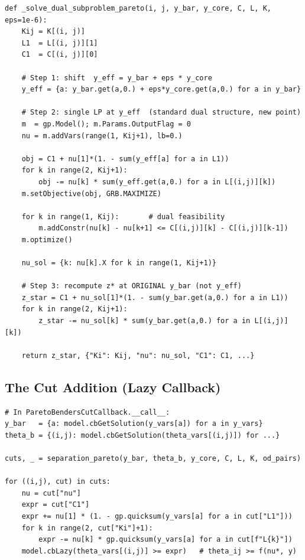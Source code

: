 \documentclass[12pt,a4paper]{article}
\begin{document}
\begin{lstlisting}[caption={Single-LP Pareto dual subproblem ($\varepsilon$-perturbation)}]
def _solve_dual_subproblem_pareto(i, j, y_bar, y_core, C, L, K, eps=1e-6):
    Kij = K[(i, j)]
    L1  = L[(i, j)][1]
    C1  = C[(i, j)][0]

    # Step 1: shift  y_eff = y_bar + eps * y_core
    y_eff = {a: y_bar.get(a,0.) + eps*y_core.get(a,0.) for a in y_bar}

    # Step 2: single LP at y_eff  (standard dual structure, new point)
    m  = gp.Model(); m.Params.OutputFlag = 0
    nu = m.addVars(range(1, Kij+1), lb=0.)

    obj = C1 + nu[1]*(1. - sum(y_eff[a] for a in L1))
    for k in range(2, Kij+1):
        obj -= nu[k] * sum(y_eff.get(a,0.) for a in L[(i,j)][k])
    m.setObjective(obj, GRB.MAXIMIZE)

    for k in range(1, Kij):       # dual feasibility
        m.addConstr(nu[k] - nu[k+1] <= C[(i,j)][k] - C[(i,j)][k-1])
    m.optimize()

    nu_sol = {k: nu[k].X for k in range(1, Kij+1)}

    # Step 3: recompute z* at ORIGINAL y_bar (not y_eff)
    z_star = C1 + nu_sol[1]*(1. - sum(y_bar.get(a,0.) for a in L1))
    for k in range(2, Kij+1):
        z_star -= nu_sol[k] * sum(y_bar.get(a,0.) for a in L[(i,j)][k])

    return z_star, {"Ki": Kij, "nu": nu_sol, "C1": C1, ...}
\end{lstlisting}

\subsection{The Cut Addition (Lazy Callback)}

\begin{lstlisting}[caption={Adding the Pareto cut as a lazy constraint}]
# In ParetoBendersCutCallback.__call__:
y_bar   = {a: model.cbGetSolution(y_vars[a]) for a in y_vars}
theta_b = {(i,j): model.cbGetSolution(theta_vars[(i,j)]) for ...}

cuts, _ = separation_pareto(y_bar, theta_b, y_core, C, L, K, od_pairs)

for ((i,j), cut) in cuts:
    nu = cut["nu"]
    expr = cut["C1"]
    expr += nu[1] * (1. - gp.quicksum(y_vars[a] for a in cut["L1"]))
    for k in range(2, cut["Ki"]+1):
        expr -= nu[k] * gp.quicksum(y_vars[a] for a in cut[f"L{k}"])
    model.cbLazy(theta_vars[(i,j)] >= expr)   # theta_ij >= f(nu*, y)
\end{lstlisting}
\end{document}
